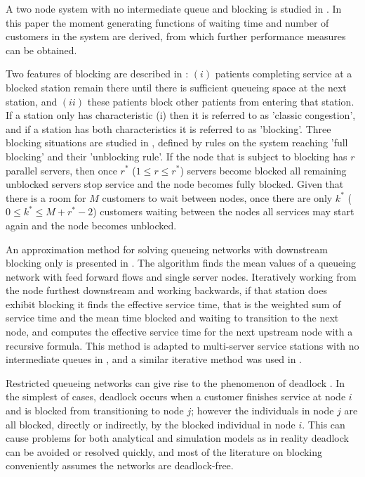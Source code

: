 \documentclass{article}
\begin{document}
A two node system with no intermediate queue and blocking is studied in \cite{aviitzhakyadin65}.
In this paper the moment generating functions of waiting time and number of customers in the system are derived, from which further performance measures can be obtained.

Two features of blocking are described in \cite{koizumietal05}: $(i)$ patients completing service at a blocked station remain there until there is sufficient queueing space at the next station, and $(ii)$ these patients block other patients from entering that station.
If a station only has characteristic (i) then it is referred to as 'classic congestion', and if a station has both characteristics it is referred to as 'blocking'.
Three blocking situations are studied in \cite{latoucheneuts80}, defined by rules on the system reaching 'full blocking' and their 'unblocking rule'.
If the node that is subject to blocking has $r$ parallel servers, then once $r^*$ ($1\leq r\leq r^*$) servers become blocked all remaining unblocked servers stop service and the node becomes fully blocked.
Given that there is a room for $M$ customers to wait between nodes, once there are only $k^*$ ($0\leq k^*\leq M+r^*-2$) customers waiting between the nodes all services may start again and the node becomes unblocked.

An approximation method for solving queueing networks with downstream blocking
only is presented in \cite{takahashi80}.
The algorithm finds the mean values of a queueing network with feed forward flows and single server nodes.
Iteratively working from the node furthest downstream and working backwards, if
that station does exhibit blocking it finds the effective service time, that is
the weighted sum of service time and the mean time blocked and waiting to
transition to the next node, and computes the effective service time for the
next upstream node with a recursive formula. %
This method is adapted to multi-server service stations with no intermediate queues in \cite{koizumietal05}, and a similar iterative method was used in \cite{korporaaletal00}.

Restricted queueing networks can give rise to the phenomenon of deadlock
\cite{}.
In the simplest of cases, deadlock occurs when a customer finishes service at node $i$ and is blocked from transitioning to node $j$; however the individuals in node $j$ are all blocked, directly or indirectly, by the blocked individual in node $i$.
This can cause problems for both analytical and simulation models as in reality deadlock can be avoided or resolved quickly, and most of
the literature on blocking conveniently assumes the networks are deadlock-free.
\end{document}
